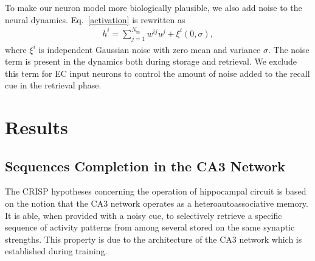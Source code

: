 \documentclass[utf8]{frontiersSCNS} %
\begin{document}
To make our neuron model more biologically plausible, we also add noise to the neural dynamics. Eq.~\ref{activation} is rewritten as
\begin{align}
\label{dynamic-noise}
h^i = \sum_{j=1}^{N_\mathrm{in}} w^{ij}u^j + \xi ^i (0,\sigma),
\end{align}  
where $\xi^i$ is independent Gaussian noise with zero mean and variance $\sigma$. The noise term is present in the dynamics both during storage and retrieval. We exclude this term for EC input neurons to control the amount of noise added to the recall cue in the retrieval phase.


\section{Results}
\subsection{Sequences Completion in the CA3 Network}

The CRISP hypotheses concerning the operation of hippocampal circuit is based on the notion that the CA3 network operates as a heteroautoassociative memory. It is able, when provided with a noisy cue, to selectively retrieve a specific sequence of activity patterns from among several stored on the same synaptic strengths. This property is due to the architecture of the CA3 network which is established during training. 
\end{document}
